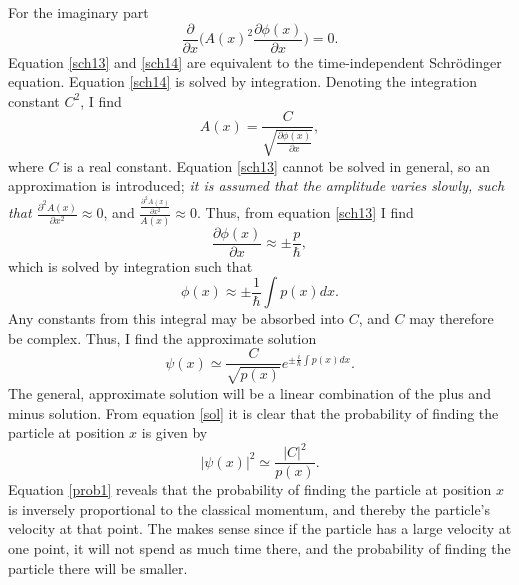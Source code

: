For the imaginary part
\begin{equation}
	\frac{\partial}{\partial x}\bigg(A(x)^2\frac{\partial \phi(x)}{\partial x}\bigg)=0.
	\label{sch14}
\end{equation} 
Equation \eqref{sch13} and \eqref{sch14} are equivalent to the time-independent Schrödinger equation. Equation \eqref{sch14} is solved by integration. Denoting the integration constant $C^2$, I find
\begin{equation}
	A(x)=\frac{C}{\sqrt{\frac{\partial \phi(x)}{\partial x}}},
	\label{A(x)}
\end{equation} 
where $C$ is a real constant. Equation \eqref{sch13} cannot be solved in general, so an approximation is introduced; \emph{it is assumed that the amplitude varies slowly, such that $\frac{\partial^2A(x)}{\partial x^2}\approx0$}, and $\frac{\frac{\partial^2A(x)}{\partial x^2}}{A(x)}\approx0$. Thus, from equation \eqref{sch13} I find
\begin{equation}
	\frac{\partial\phi(x)}{\partial x}\approx\pm\frac{p}{\hbar},
	\label{sch15}
\end{equation} 
which is solved by integration such that
\begin{equation}
	\phi(x)\approx\pm\frac{1}{\hbar}\int p(x)dx.
	\label{phi(x)}
\end{equation} 
Any constants from this integral may be absorbed into $C$, and $C$ may therefore be complex. Thus, I find the approximate solution
\begin{equation}
	\psi(x)\simeq\frac{C}{\sqrt{p(x)}}e^{\pm\frac{i}{\hbar}\int p(x)dx}.
	\label{sol}
\end{equation} 
The general, approximate solution will be a linear combination of the plus and minus solution. From equation \eqref{sol} it is clear that the probability of finding the particle at position $x$ is given by
\begin{equation}
	|\psi(x)|^2\simeq\frac{|C|^2}{p(x)}.
	\label{prob1}
\end{equation} 
Equation \eqref{prob1} reveals that the probability of finding the particle at position $x$ is inversely proportional to the classical momentum, and thereby the particle's velocity at that point. The makes sense since if the particle has a large velocity at one point, it will not spend as much time there, and the probability of finding the particle there will be smaller.

